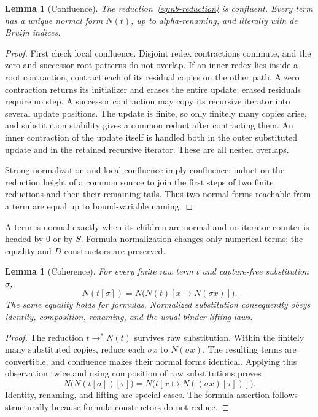 \documentclass[11pt,a4paper]{article}
\newtheorem{lemma}[theorem]{Lemma}
\theoremstyle{definition}\newtheorem{definition}[theorem]{Definition}
\theoremstyle{remark}\newtheorem{remark}[theorem]{Remark}
\begin{document}
\begin{lemma}[Confluence]
\label{lem:nb-confluence}
The reduction~\eqref{eq:nb-reduction} is confluent. Every term has a unique
normal form $N(t)$, up to alpha-renaming, and literally with de Bruijn
indices.
\end{lemma}
\begin{proof}
First check local confluence. Disjoint redex contractions commute, and
the zero and successor root patterns do not overlap. If an inner redex
lies inside a root contraction, contract each of its residual copies on
the other path. A zero contraction returns its initializer and erases
the entire update; erased residuals require no step. A successor
contraction may copy its recursive iterator into
several update positions. The update is finite, so only finitely many
copies arise, and substitution stability gives a common reduct after
contracting them. An inner contraction of the update itself is handled
both in the outer substituted update and in the retained recursive
iterator. These are all nested overlaps.

Strong normalization and local confluence imply confluence: induct on
the reduction height of a common source to join the first steps of two
finite reductions and then their remaining tails. Thus two normal forms
reachable from a term are equal up to bound-variable naming.
\end{proof}

A term is normal exactly when its children are normal and no iterator
counter is headed by $0$ or by $S$. Formula normalization changes only
numerical terms; the equality and $D$ constructors are preserved.

\begin{lemma}[Coherence]
\label{lem:nb-coherence}
For every finite raw term $t$ and capture-free substitution $\sigma$,
\[
 N(t[\sigma])=
 N\bigl(N(t)[x\mapsto N(\sigma x)]\bigr).
 \tag{Coherence}\label{eq:nb-coherence}
\]
The same equality holds for formulas. Normalized substitution consequently
obeys identity, composition, renaming, and the usual binder-lifting laws.
\end{lemma}
\begin{proof}
The reduction $t\to^*N(t)$ survives raw substitution. Within the finitely
many substituted copies, reduce each $\sigma x$ to $N(\sigma x)$.
The resulting terms are convertible, and confluence makes their normal
forms identical. Applying this observation twice and using composition
of raw substitutions proves
\[
 N\bigl(N(t[\sigma])[\tau]\bigr)
   =N\bigl(t[x\mapsto N((\sigma x)[\tau])]\bigr).
\]
Identity, renaming, and lifting are special cases. The formula assertion
follows structurally because formula constructors do not reduce.
\end{proof}
\end{document}
